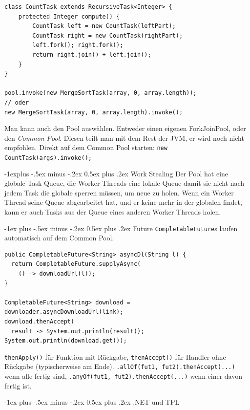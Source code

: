 \documentclass[a4paper, fontsize=6pt]{scrartcl}
\makeatletter
\renewcommand{\section}{\@startsection{section}{1}{0mm}%
    {-1ex plus -.5ex minus -.2ex}%
    {0.5ex plus .2ex}%
    {\normalfont\large\bfseries}}
\renewcommand{\subsection}{\@startsection{subsection}{2}{0mm}%
    {-1explus -.5ex minus -.2ex}%
    {0.5ex plus .2ex}%
    {\normalfont\normalsize\bfseries}}
\makeatother
\begin{document}
\begin{multicols*}{5}
\begin{verbatim}
class CountTask extends RecursiveTask<Integer> {
    protected Integer compute() {
        CountTask left = new CountTask(leftPart);
        CountTask right = new CountTask(rightPart);
        left.fork(); right.fork();
        return right.join() + left.join();
    }
}

pool.invoke(new MergeSortTask(array, 0, array.length));
// oder
new MergeSortTask(array, 0, array.length).invoke();
\end{verbatim}

Man kann auch den Pool auswählen. Entweder einen eigenen ForkJoinPool, oder den \textit{Common Pool}. Diesen teilt man mit dem Rest der JVM, er wird noch nicht empfohlen. Direkt auf dem Common Pool starten: \texttt{new CountTask(args).invoke();}

\subsection{Work Stealing}
Der Pool hat eine globale Task Queue, die Worker Threads eine lokale Queue damit sie nicht nach jedem Task die globale sperren müssen, um neue zu holen. Wenn ein Worker Thread seine Queue abgearbeitet hat, und er keine mehr in der globalen findet, kann er auch Tasks aus der Queue eines anderen Worker Threads holen.

\section{Future}
\texttt{CompletableFuture}s laufen automatisch auf dem Common Pool.

\begin{verbatim}
public CompletableFuture<String> asyncDl(String l) {
  return CompletableFuture.supplyAsync(
    () -> downloadUrl(l));
}

CompletableFuture<String> download = 
downloader.asyncDownloadUrl(link);
download.thenAccept(
  result -> System.out.println(result));
System.out.println(download.get());
\end{verbatim}

\texttt{thenApply()} für Funktion mit Rückgabe, \texttt{thenAccept()} für Handler ohne Rückgabe (typischerweise am Ende). \texttt{.allOf(fut1, fut2).thenAccept(...)} wenn alle fertig sind, \texttt{.anyOf(fut1, fut2).thenAccept(...)} wenn einer davon fertig ist.

\section{.NET und TPL}


\end{multicols*}
\end{document}
